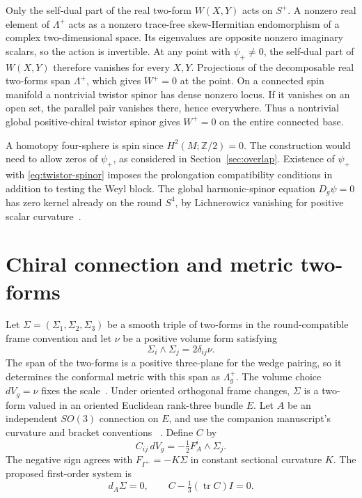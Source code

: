 \documentclass[11pt]{article}
\numberwithin{equation}{section}
\DeclareMathOperator{\tr}{tr}
\begin{document}
Only the self-dual part of the real two-form \(W(X,Y)\) acts on
\(S^+\). A nonzero real element of \(\Lambda^+\) acts as a nonzero
trace-free skew-Hermitian endomorphism of a complex two-dimensional
space. Its eigenvalues are opposite nonzero imaginary scalars, so the
action is invertible. At any point with \(\psi_+\ne0\), the
self-dual part of \(W(X,Y)\) therefore vanishes for every \(X,Y\).
Projections of the decomposable real two-forms span \(\Lambda^+\),
which gives \(W^+=0\) at the point. On a connected spin manifold a
nontrivial twistor spinor has dense nonzero locus. If it vanishes on
an open set, the parallel pair vanishes there, hence everywhere.
Thus a nontrivial global positive-chiral twistor spinor gives
\(W^+=0\) on the entire connected base.

A homotopy four-sphere is spin since
\(H^2(M;\mathbb Z/2)=0\). The construction would need to allow zeros
of \(\psi_+\), as considered in Section~\ref{sec:overlap}.
Existence of \(\psi_+\) with \eqref{eq:twistor-spinor} imposes the
prolongation compatibility conditions in addition to testing the
Weyl block. The global harmonic-spinor equation \(D_g\psi=0\)
has zero kernel already on the round \(S^4\), by Lichnerowicz
vanishing for positive scalar curvature~\cite[p.~460]{AHS1978}.

\section{Chiral connection and metric two-forms}
\label{sec:connection}

Let \(\Sigma=(\Sigma_1,\Sigma_2,\Sigma_3)\) be a smooth triple of
two-forms in the round-compatible frame convention and let \(\nu\)
be a positive volume form satisfying
\begin{equation}\label{eq:frame}
 \Sigma_i\wedge\Sigma_j=2\delta_{ij}\nu.
\end{equation}
The span of the two-forms is a positive three-plane for the wedge
pairing, so it determines the conformal metric with this span as
\(\Lambda_g^+\). The volume choice \(dV_g=\nu\) fixes the
scale~\cite[Definitions~1.3--1.6]{Fine2011}. Under oriented
orthogonal frame changes, \(\Sigma\) is a two-form valued in an
oriented Euclidean rank-three bundle \(E\).
Let \(A\) be an independent \(SO(3)\) connection on \(E\), and use
the companion manuscript's curvature and bracket
conventions~\cite[Sections~1.3 and~1.6]{Fine2011}
\cite[adapted frame and compatibility in Section~4]{Baker2026ChiralMetricEvolution}.
Define \(C\) by
\begin{equation}\label{eq:positive-block}
 C_{ij}\,dV_g=-\tfrac12 F_A^i\wedge\Sigma_j .
\end{equation}
The negative sign agrees with \(F_{\Gamma^+}=-K\Sigma\) in constant
sectional curvature \(K\). The proposed first-order system is
\begin{equation}\label{eq:chiral-first-order}
 d_A\Sigma=0,\qquad C-\tfrac13(\tr C)I=0.
\end{equation}
\end{document}
